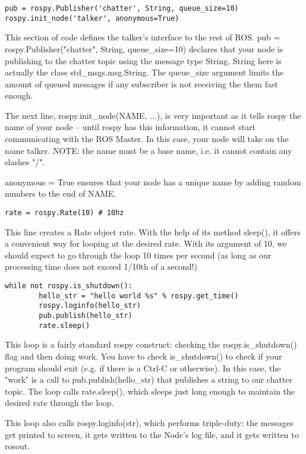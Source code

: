 \begin{lstlisting}[breaklines=true languages=python]
pub = rospy.Publisher('chatter', String, queue_size=10)
rospy.init_node('talker', anonymous=True)
\end{lstlisting}

This section of code defines the talker's interface to the rest of ROS. pub = rospy.Publisher("chatter", String, queue\_size=10) declares that your node is publishing to the chatter topic using the message type String. String here is actually the class std\_msgs.msg.String. The queue\_size argument limits the amount of queued messages if any subscriber is not receiving the them fast enough.

The next line, rospy.init\_node(NAME, ...), is very important as it tells rospy the name of your node -- until rospy has this information, it cannot start communicating with the ROS Master. In this case, your node will take on the name talker. NOTE: the name must be a base name, i.e. it cannot contain any slashes "/".

anonymous = True ensures that your node has a unique name by adding random numbers to the end of NAME.

\begin{lstlisting}[breaklines=true languages=python]
rate = rospy.Rate(10) # 10hz
\end{lstlisting}

This line creates a Rate object rate. With the help of its method sleep(), it offers a convenient way for looping at the desired rate. With its argument of 10, we should expect to go through the loop 10 times per second (as long as our processing time does not exceed 1/10th of a second!)

\begin{lstlisting}[breaklines=true languages=python]
    while not rospy.is_shutdown():
		hello_str = "hello world %s" % rospy.get_time()
		rospy.loginfo(hello_str)
		pub.publish(hello_str)
		rate.sleep()
\end{lstlisting}

This loop is a fairly standard rospy construct: checking the rospy.is\_shutdown() flag and then doing work. You have to check is\_shutdown() to check if your program should exit (e.g. if there is a Ctrl-C or otherwise). In this case, the "work" is a call to pub.publish(hello\_str) that publishes a string to our chatter topic. The loop calls rate.sleep(), which sleeps just long enough to maintain the desired rate through the loop.

This loop also calls rospy.loginfo(str), which performs triple-duty: the messages get printed to screen, it gets written to the Node's log file, and it gets written to rosout.

